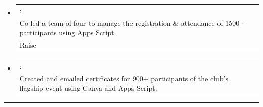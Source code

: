 \documentclass[a4paper,11pt]{article}
\makeatletter
\newcommand{\resumePOR}[3]{
\vspace{0.5mm}\item[]
    \begin{tabular*}{\textwidth}[t]{l@{\extracolsep{\fill}}r}
    \hspace{-3mm}{#1}:\hspace{1mm} & \hspace*{0pt}\hfill{\footnotesize{ #3}} \vspace{-0.5mm}\\ \hspace{-2.9mm}#2 
    \end{tabular*}
    \vspace{0mm}
}
\newcommand{\resumeSubHeadingListStart}{\begin{itemize}[leftmargin=*,labelsep=0mm,itemsep=-2.5mm]}
\newcommand{\resumeSubHeadingListEnd}{\end{itemize}\vspace{-2mm}}
\makeatother
\begin{document}
\resumeSubHeadingListStart
\resumePOR{\textbf{Sr. Data Manager, Association of Computer Engineering Students, DIT}} %
{Co-led a team of four to manage the registration \& attendance of 1500+ participants using Apps Script.
\\
Raise }{\raisebox{0.75pt}{2023 - 2024}}
\vspace{0.5mm}
\resumePOR{\textbf{Jr. Technical Head, Association of Computer Engineering Students, DIT}}
{Created and emailed certificates for 900+ participants of the club's flagship event using Canva and Apps Script.}
{\raisebox{0.75pt}{2022 - 2023}}
\vspace{-1mm}
\resumeSubHeadingListEnd
\hspace*{-2mm}\rule{1.030\textwidth}{0.1mm}
\vspace{0mm}

\end{document}
